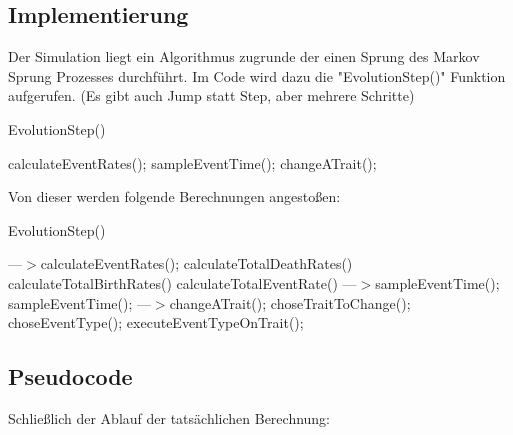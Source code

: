 \documentclass[11pt, a4paper, german]{article}
\begin{document}
	\subsection{Implementierung}
	Der Simulation liegt ein Algorithmus zugrunde der einen Sprung des Markov Sprung Prozesses durchführt. Im Code wird dazu die "{}EvolutionStep()"{} Funktion aufgerufen. (Es gibt auch Jump statt Step, aber mehrere Schritte)
	\begin{algorithm}[H]
		\caption{EvolutionStep()}
		\begin{algorithmic}[1]
			\STATE calculateEventRates();
			\STATE sampleEventTime();
			\STATE changeATrait();
		\end{algorithmic}
	\end{algorithm}
	
	Von dieser werden folgende Berechnungen angestoßen:
		
	\begin{algorithm}[H]
		\caption{EvolutionStep()}
		\begin{algorithmic}[1]
			\STATE ---$>$calculateEventRates();
			\STATE calculateTotalDeathRates()
			\STATE calculateTotalBirthRates()
			\STATE calculateTotalEventRate()
			\STATE ---$>$sampleEventTime();
			\STATE sampleEventTime();
			\STATE ---$>$changeATrait();
			\STATE choseTraitToChange();
			\STATE choseEventType();
			\STATE executeEventTypeOnTrait();
		\end{algorithmic}
	\end{algorithm}
	
	\subsection{Pseudocode}
	Schließlich der Ablauf der tatsächlichen Berechnung:
	
\end{document}

